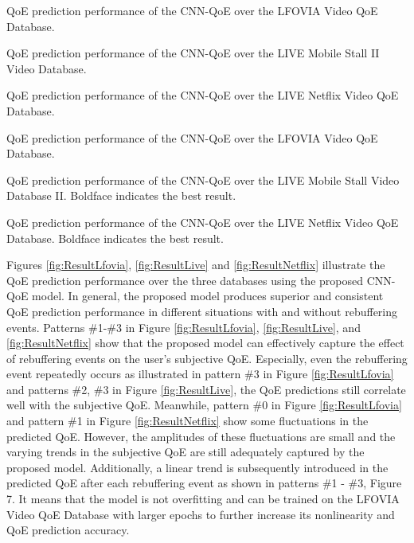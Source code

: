    {QoE prediction performance of the CNN-QoE over the LFOVIA Video QoE Database.\label{fig:ResultLfovia}}

   {QoE prediction performance of the CNN-QoE over the LIVE Mobile Stall II Video Database.\label{fig:ResultLive}}

   {QoE prediction performance of the CNN-QoE over the LIVE Netflix Video QoE Database.\label{fig:ResultNetflix}}


\begin{table}[t]
  \caption{QoE prediction performance of the CNN-QoE over the LFOVIA Video QoE Database.}
  \label{tbl:Accuracy_LFOVIA}
  \centering
  
\end{table}

\begin{table}[t]
  \caption{QoE prediction performance of the CNN-QoE over the LIVE Mobile Stall Video Database II. Boldface indicates the best result.}
  \label{tbl:Accuracy_LiveMobileStall}
  \centering
  
\end{table}

\begin{table}[t]
  \caption{QoE prediction performance of the CNN-QoE over the LIVE Netflix Video QoE Database. Boldface indicates the best result.}
  \label{tbl:Accuracy_LiveNetflix}
  \centering
  
\end{table}


Figures \ref{fig:ResultLfovia}, \ref{fig:ResultLive} and \ref{fig:ResultNetflix} illustrate the QoE prediction performance over the three databases using the proposed CNN-QoE model.
In general, the proposed model produces superior and consistent QoE prediction performance in different situations with and without rebuffering events.
Patterns \#1-\#3 in Figure \ref{fig:ResultLfovia}, \ref{fig:ResultLive}, and \ref{fig:ResultNetflix} show that the proposed model can effectively capture the effect of rebuffering events on the user's subjective QoE.
Especially, even the rebuffering event repeatedly occurs as illustrated in pattern \#3 in Figure \ref{fig:ResultLfovia} and patterns \#2, \#3 in Figure \ref{fig:ResultLive}, the QoE predictions still correlate well with the subjective QoE.
Meanwhile, pattern \#0 in Figure \ref{fig:ResultLfovia} and pattern \#1 in Figure \ref{fig:ResultNetflix} show some fluctuations in the predicted QoE.
However, the amplitudes of these fluctuations are small and the varying trends in the subjective QoE are still adequately captured by the proposed model.
Additionally, a linear trend is subsequently introduced in the predicted QoE after each rebuffering event as shown in patterns \#1 - \#3, Figure 7.
It means that the model is not overfitting and can be trained on the LFOVIA Video QoE Database with larger epochs to further increase its nonlinearity and QoE prediction accuracy.

